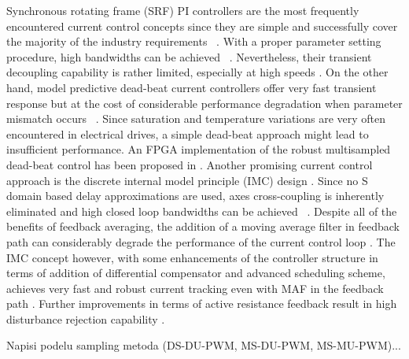 \documentclass[journal]{IEEEtran}
\begin{document}
Synchronous rotating frame (SRF) PI controllers are the most frequently encountered current control concepts since they are simple and successfully cover the majority of the industry requirements ~\cite{rowan1986,bae2003,yepes2014}. With a proper parameter setting procedure, high bandwidths can be achieved ~\cite{yepes2014,holmes2009}. Nevertheless, their transient decoupling capability is rather limited, especially at high speeds \cite{lorenz2000}. On the other hand, model predictive dead-beat current controllers offer very fast transient response but at the cost of considerable performance degradation when parameter mismatch occurs ~\cite{malesani1999,xu2019}. Since saturation and temperature variations are very often encountered in electrical drives, a simple dead-beat approach might lead to insufficient performance. An FPGA implementation of the robust multisampled dead-beat control has been proposed in \cite{rovere2018}. Another promising current control approach is the discrete internal model principle (IMC) design \cite{lorenz2010}. Since no S domain based delay approximations are used, axes cross-coupling is inherently eliminated and high closed loop bandwidths can be achieved ~\cite{commentsHoffmann,vuksa2016}. Despite all of the benefits of feedback averaging, the addition of a moving average filter in feedback path can considerably degrade the performance of the current control loop \cite{vuksa2016}. The IMC concept however, with some enhancements of the controller structure in terms of addition of differential compensator and advanced scheduling scheme, achieves very fast and robust current tracking even with MAF in the feedback path \cite{vuksa2017}. Further improvements in terms of active resistance feedback result in high disturbance rejection capability \cite{vuksa2018}. 

Napisi podelu sampling metoda (DS-DU-PWM, MS-DU-PWM, MS-MU-PWM)...
\end{document}
